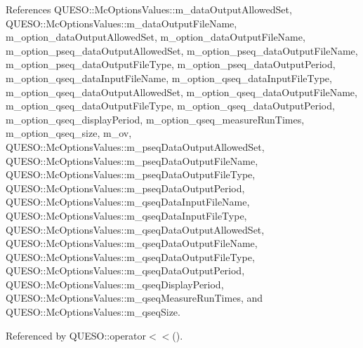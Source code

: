 References Q\-U\-E\-S\-O\-::\-Mc\-Options\-Values\-::m\-\_\-data\-Output\-Allowed\-Set, Q\-U\-E\-S\-O\-::\-Mc\-Options\-Values\-::m\-\_\-data\-Output\-File\-Name, m\-\_\-option\-\_\-data\-Output\-Allowed\-Set, m\-\_\-option\-\_\-data\-Output\-File\-Name, m\-\_\-option\-\_\-pseq\-\_\-data\-Output\-Allowed\-Set, m\-\_\-option\-\_\-pseq\-\_\-data\-Output\-File\-Name, m\-\_\-option\-\_\-pseq\-\_\-data\-Output\-File\-Type, m\-\_\-option\-\_\-pseq\-\_\-data\-Output\-Period, m\-\_\-option\-\_\-qseq\-\_\-data\-Input\-File\-Name, m\-\_\-option\-\_\-qseq\-\_\-data\-Input\-File\-Type, m\-\_\-option\-\_\-qseq\-\_\-data\-Output\-Allowed\-Set, m\-\_\-option\-\_\-qseq\-\_\-data\-Output\-File\-Name, m\-\_\-option\-\_\-qseq\-\_\-data\-Output\-File\-Type, m\-\_\-option\-\_\-qseq\-\_\-data\-Output\-Period, m\-\_\-option\-\_\-qseq\-\_\-display\-Period, m\-\_\-option\-\_\-qseq\-\_\-measure\-Run\-Times, m\-\_\-option\-\_\-qseq\-\_\-size, m\-\_\-ov, Q\-U\-E\-S\-O\-::\-Mc\-Options\-Values\-::m\-\_\-pseq\-Data\-Output\-Allowed\-Set, Q\-U\-E\-S\-O\-::\-Mc\-Options\-Values\-::m\-\_\-pseq\-Data\-Output\-File\-Name, Q\-U\-E\-S\-O\-::\-Mc\-Options\-Values\-::m\-\_\-pseq\-Data\-Output\-File\-Type, Q\-U\-E\-S\-O\-::\-Mc\-Options\-Values\-::m\-\_\-pseq\-Data\-Output\-Period, Q\-U\-E\-S\-O\-::\-Mc\-Options\-Values\-::m\-\_\-qseq\-Data\-Input\-File\-Name, Q\-U\-E\-S\-O\-::\-Mc\-Options\-Values\-::m\-\_\-qseq\-Data\-Input\-File\-Type, Q\-U\-E\-S\-O\-::\-Mc\-Options\-Values\-::m\-\_\-qseq\-Data\-Output\-Allowed\-Set, Q\-U\-E\-S\-O\-::\-Mc\-Options\-Values\-::m\-\_\-qseq\-Data\-Output\-File\-Name, Q\-U\-E\-S\-O\-::\-Mc\-Options\-Values\-::m\-\_\-qseq\-Data\-Output\-File\-Type, Q\-U\-E\-S\-O\-::\-Mc\-Options\-Values\-::m\-\_\-qseq\-Data\-Output\-Period, Q\-U\-E\-S\-O\-::\-Mc\-Options\-Values\-::m\-\_\-qseq\-Display\-Period, Q\-U\-E\-S\-O\-::\-Mc\-Options\-Values\-::m\-\_\-qseq\-Measure\-Run\-Times, and Q\-U\-E\-S\-O\-::\-Mc\-Options\-Values\-::m\-\_\-qseq\-Size.



Referenced by Q\-U\-E\-S\-O\-::operator$<$$<$().


